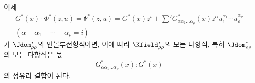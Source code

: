 
이제
\[
\begin{gathered}
G^*(x)\cdot\Phi^*(z,u)=\Psi^*(z,u)=G^*(x)z^i+
\sum{}'G^*_{\alpha\alpha_1\ldots\alpha_\rho}(x)z^\alpha u_1^{\alpha_1}\cdots u_\rho^{\alpha_\rho}\\
(\alpha+\alpha_1+\cdots+\alpha_\rho=i)
\end{gathered}
\]
가 $\Jdom^*_{\rho\rho}$의 인볼루션형식이면, 이에 따라 $\Kfield^*_{\rho\rho}$의 모든 다항식, 특히 $\Jdom^*_{\rho\rho}$의 모든 다항식은 몫
\[
G^*_{\alpha\alpha_1\ldots\alpha_\rho}(x):G^*(x)
\]
의 정유리 결합이 된다.
